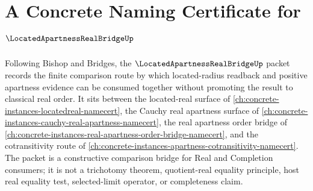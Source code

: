 \chapter{A Concrete Naming Certificate for $\LocatedApartnessRealBridgeUp$}
\label{ch:concrete-instances-located-apartness-real-bridge-namecert}

Following Bishop and Bridges, the $\LocatedApartnessRealBridgeUp$ packet records the finite comparison route by which located-radius readback and positive apartness evidence can be consumed together without promoting the result to classical real order. It sits between the located-real surface of \autoref{ch:concrete-instances-locatedreal-namecert}, the Cauchy real apartness surface of \autoref{ch:concrete-instances-cauchy-real-apartness-namecert}, the real apartness order bridge of \autoref{ch:concrete-instances-real-apartness-order-bridge-namecert}, and the cotransitivity route of \autoref{ch:concrete-instances-apartness-cotransitivity-namecert}. The packet is a constructive comparison bridge for Real and Completion consumers; it is not a trichotomy theorem, quotient-real equality principle, host real equality test, selected-limit operator, or completeness claim.

